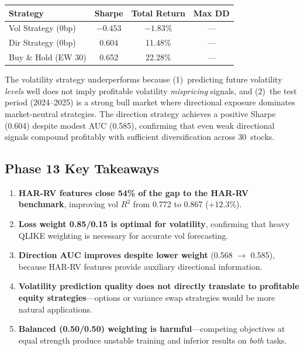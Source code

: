 \documentclass[12pt,a4paper]{article}
\begin{document}
\begin{center}
\begin{tabular}{lccc}
\toprule
\textbf{Strategy} & \textbf{Sharpe} & \textbf{Total Return} & \textbf{Max DD} \\
\midrule
Vol Strategy (0bp)  & $-0.453$ & $-1.83\%$ & --- \\
Dir Strategy (0bp)  & 0.604   & 11.48\%   & --- \\
Buy \& Hold (EW 30) & 0.652   & 22.28\%   & --- \\
\bottomrule
\end{tabular}
\end{center}

The volatility strategy underperforms because (1)~predicting future volatility
\emph{levels} well does not imply profitable volatility \emph{mispricing} signals,
and (2)~the test period (2024--2025) is a strong bull market where directional
exposure dominates market-neutral strategies.  The direction strategy achieves a
positive Sharpe (0.604) despite modest AUC (0.585), confirming that even weak
directional signals compound profitably with sufficient diversification across
30~stocks.

\subsection{Phase 13 Key Takeaways}
\begin{enumerate}
    \item \textbf{HAR-RV features close 54\% of the gap to the HAR-RV benchmark},
          improving vol $R^2$ from 0.772 to 0.867 ($+12.3\%$).
    \item \textbf{Loss weight 0.85/0.15 is optimal for volatility}, confirming
          that heavy QLIKE weighting is necessary for accurate vol forecasting.
    \item \textbf{Direction AUC improves despite lower weight} (0.568 $\to$ 0.585),
          because HAR-RV features provide auxiliary directional information.
    \item \textbf{Volatility prediction quality does not directly translate to
          profitable equity strategies}---options or variance swap strategies
          would be more natural applications.
    \item \textbf{Balanced (0.50/0.50) weighting is harmful}---competing objectives
          at equal strength produce unstable training and inferior results on
          \emph{both} tasks.
\end{enumerate}
\end{document}
